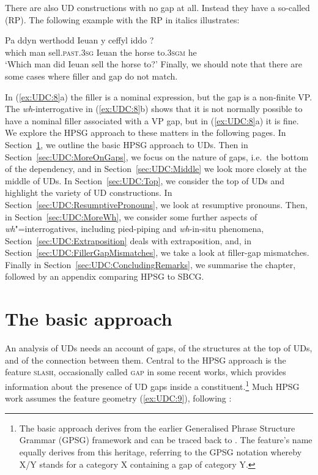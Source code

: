 \documentclass[output=paper
,notxmath 
	        ,collection
	        ,collectionchapter
 	        ,biblatex
                ,babelshorthands
                ,newtxmath
                ,draftmode
                ,colorlinks, citecolor=brown
]{langscibook}
\begin{document}
\noindent 
There are also UD constructions with no gap at all. Instead they
have a so-called  (RP). The following 
example with the RP in italics illustrates:

\ea
\label{ex:UDC:7}
\gll Pa ddyn werthodd Ieuan y ceffyl iddo ?\\
     which man sell.\textsc{past.3sg} Ieuan the horse to\textsc{.3sgm} he\\
\glt `Which man did Ieuan sell the horse to?'
\z
\noindent
Finally, we should note that there are some cases where filler and gap
do not match.

\eal
\label{ex:UDC:8} 
\zl

\noindent 
In (\ref{ex:UDC:8}a) the filler is a nominal expression, but the
gap is a non-finite VP. The \emph{wh}-interrogative in
(\ref{ex:UDC:8}b) shows that it is not normally possible to have a
nominal filler associated with a VP gap, but in (\ref{ex:UDC:8}a) it
is fine.  We explore the HPSG approach to these matters in the
following pages. In Section~\ref{sec:UDC:BasicApproach}, we outline
the basic HPSG approach to UDs. Then in
Section~\ref{sec:UDC:MoreOnGaps}, we focus on the nature of gaps,
i.e.\ the bottom of the dependency, and in Section~\ref{sec:UDC:Middle}
we look more closely at the middle of UDs. In
Section~\ref{sec:UDC:Top}, we consider the top of UDs and highlight
the variety of UD constructions. In
Section~\ref{sec:UDC:ResumptivePronouns}, we look at resumptive
pronouns. Then, in Section~\ref{sec:UDC:MoreWh}, we consider some
further aspects of \emph{wh}"=interrogatives, including pied-piping
and \emph{wh}-in-situ phenomena, Section~\ref{sec:UDC:Extraposition} deals with extraposition, and, in
Section~\ref{sec:UDC:FillerGapMismatches}, we take a look at
filler-gap mismatches.  Finally in
Section~\ref{sec:UDC:ConcludingRemarks}, we summarise the chapter,
followed by an appendix comparing HPSG to SBCG.  

\section{The basic approach}
\label{sec:UDC:BasicApproach} 

An analysis of UDs needs an
account of gaps, of the structures at the top of UDs, and of the
connection between them. Central to the HPSG approach is the feature
\textsc{slash}, occasionally called \textsc{gap} in some recent works,
which provides information about the presence of UD gaps inside a
constituent.\footnote{The basic approach derives from the earlier
  Generalised Phrase Structure Grammar (GPSG) framework
  \citep*{Gazdar85} and can be traced back to \citet{gazdar_g81}. The
  feature's name equally derives from this heritage, referring to the
  GPSG notation whereby X/Y stands for a category X containing a gap of
  category Y.} 
Much HPSG work assumes the feature geometry (\ref{ex:UDC:9}), following \citet[Chapter~4]{Pollard:Sag:94}:
\end{document}
